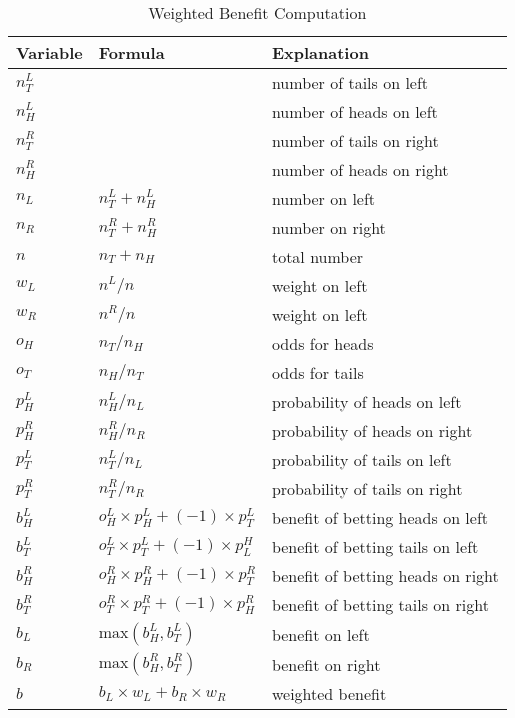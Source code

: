 \begin{table}
\centering
\begin{tabular}{|l|l|l|} \hline \hline
{\bf Variable} & {\bf Formula} & {\bf Explanation} \\ \hline \hline
\(n_T^L\)  & & number of tails on left \\ \hline
\(n_H^L\)  & & number of heads on left \\ \hline
\(n_T^R\)  & & number of tails on right \\ \hline
\(n_H^R\) & & number of heads on right \\ \hline

\(n_L\)    & \(n_T^L + n_H^L \) & number on left \\ \hline
\(n_R\)    & \(n_T^R + n_H^R \) & number on right \\ \hline

\(n\)      & \(n_T + n_H \) & total number \\ \hline

\(w_L \) & \( n^L/n\)  & weight on left \\ \hline
\(w_R \) & \( n^R/n\)  & weight on left \\ \hline
\hline
\(o_H \) & \( n_T/n_H\) & odds for heads \\ \hline
\(o_T \) & \( n_H/n_T\) & odds for tails \\ \hline
\hline

\(p_H^L \) & \( n_H^L/n_L\) & probability of heads on left \\ \hline
\(p_H^R \) & \( n_H^R/n_R\) & probability of heads on right \\ \hline
\(p_T^L \) & \( n_T^L/n_L\) & probability of tails on left \\ \hline
\(p_T^R \) & \( n_T^R/n_R\) & probability of tails on right \\ \hline
\hline

\(b_H^L\) &  \(o_H^L \times p_H^L + (-1)  \times p_T^L\) &
            benefit of betting heads on left \\ \hline
\(b_T^L\) & \(o_T^L \times p_T^L + (-1)  \times p^H_L \) &
            benefit of betting tails on left \\ \hline

\(b_H^R\) & \(o_H^R \times p_H^R + (-1)  \times p_T^R \) &
            benefit of betting heads on right \\ \hline
\(b_T^R\) & \(o_T^R \times p_T^R + (-1)  \times p_H^R \) &
            benefit of betting tails on right \\ \hline
\hline

\(b_L\) & \( \mathrm{max}(b_H^L, b_T^L)\) & benefit on left \\ \hline
\(b_R\) & \( \mathrm{max}(b_H^R, b_T^R)\) & benefit on right \\ \hline
\hline

\(b\) &  \(b_L \times w_L + b_R \times w_R\) & weighted benefit \\ \hline
\end{tabular}
\label{algo_weighted_benefit}
\caption{Weighted Benefit Computation}
\end{table}
